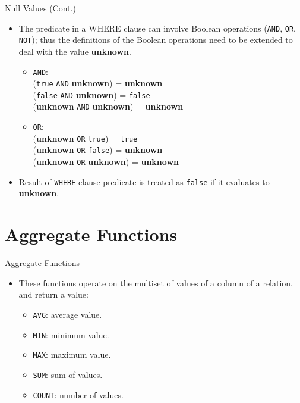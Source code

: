\documentclass[aspectratio=169]{beamer}
\begin{document}
\begin{frame}[fragile]{Null Values (Cont.)}
    \begin{itemize}
        \item The predicate in a WHERE clause can involve Boolean operations (\texttt{AND}, \texttt{OR}, \texttt{NOT}); thus the definitions of the Boolean operations need to be extended to deal with the value \textbf{unknown}. \pause
        \begin{itemize}
            \item \texttt{AND}:\\ 
                (\texttt{true} \texttt{AND} \textbf{unknown}) = \textbf{unknown}\\
                (\texttt{false} \texttt{AND} \textbf{unknown}) = \texttt{false}\\
                (\textbf{unknown} \texttt{AND} \textbf{unknown}) = \textbf{unknown} \pause
            \item \texttt{OR}:\\ 
                (\textbf{unknown} \texttt{OR} \texttt{true}) = \texttt{true}\\
                (\textbf{unknown} \texttt{OR} \texttt{false}) = \textbf{unknown}\\
                (\textbf{unknown} \texttt{OR} \textbf{unknown}) = \textbf{unknown} \pause
        \end{itemize}
        \item Result of \texttt{WHERE} clause predicate is treated as \texttt{false} if it evaluates to \textbf{unknown}.
    \end{itemize}
\end{frame}

\section{Aggregate Functions}

\begin{frame}[fragile]{Aggregate Functions}
    \begin{itemize}
        \item These functions operate on the multiset of values of a column of a relation, and return a value:
        \begin{itemize}
            \item \texttt{AVG}: average value.
            \item \texttt{MIN}: minimum value.
            \item \texttt{MAX}: maximum value.
            \item \texttt{SUM}: sum of values.
            \item \texttt{COUNT}: number of values.
        \end{itemize}
    \end{itemize}
\end{frame}
\end{document}
